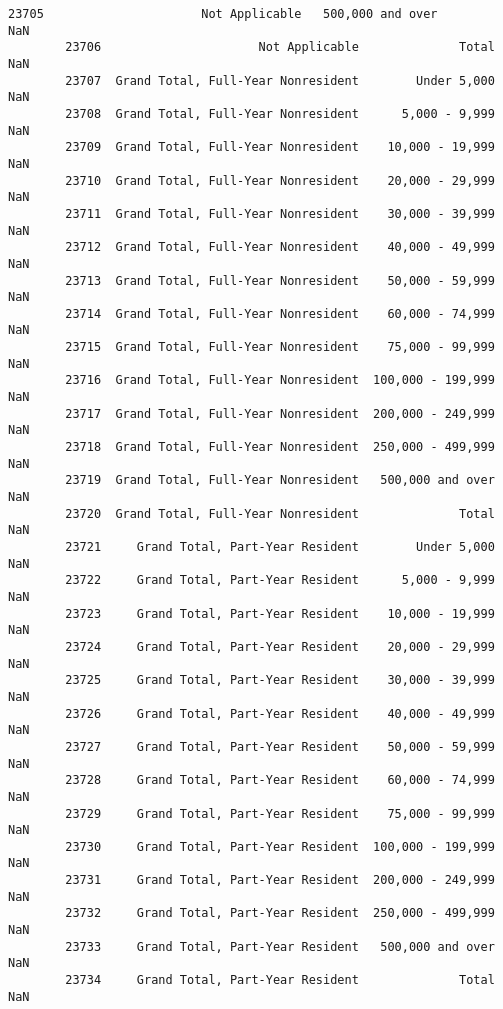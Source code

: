 \documentclass[11pt]{article}
\begin{document}
\begin{Verbatim}[commandchars=\\\{\}]
        23705                      Not Applicable   500,000 and over        NaN   
        23706                      Not Applicable              Total        NaN   
        23707  Grand Total, Full-Year Nonresident        Under 5,000        NaN   
        23708  Grand Total, Full-Year Nonresident      5,000 - 9,999        NaN   
        23709  Grand Total, Full-Year Nonresident    10,000 - 19,999        NaN   
        23710  Grand Total, Full-Year Nonresident    20,000 - 29,999        NaN   
        23711  Grand Total, Full-Year Nonresident    30,000 - 39,999        NaN   
        23712  Grand Total, Full-Year Nonresident    40,000 - 49,999        NaN   
        23713  Grand Total, Full-Year Nonresident    50,000 - 59,999        NaN   
        23714  Grand Total, Full-Year Nonresident    60,000 - 74,999        NaN   
        23715  Grand Total, Full-Year Nonresident    75,000 - 99,999        NaN   
        23716  Grand Total, Full-Year Nonresident  100,000 - 199,999        NaN   
        23717  Grand Total, Full-Year Nonresident  200,000 - 249,999        NaN   
        23718  Grand Total, Full-Year Nonresident  250,000 - 499,999        NaN   
        23719  Grand Total, Full-Year Nonresident   500,000 and over        NaN   
        23720  Grand Total, Full-Year Nonresident              Total        NaN   
        23721     Grand Total, Part-Year Resident        Under 5,000        NaN   
        23722     Grand Total, Part-Year Resident      5,000 - 9,999        NaN   
        23723     Grand Total, Part-Year Resident    10,000 - 19,999        NaN   
        23724     Grand Total, Part-Year Resident    20,000 - 29,999        NaN   
        23725     Grand Total, Part-Year Resident    30,000 - 39,999        NaN   
        23726     Grand Total, Part-Year Resident    40,000 - 49,999        NaN   
        23727     Grand Total, Part-Year Resident    50,000 - 59,999        NaN   
        23728     Grand Total, Part-Year Resident    60,000 - 74,999        NaN   
        23729     Grand Total, Part-Year Resident    75,000 - 99,999        NaN   
        23730     Grand Total, Part-Year Resident  100,000 - 199,999        NaN   
        23731     Grand Total, Part-Year Resident  200,000 - 249,999        NaN   
        23732     Grand Total, Part-Year Resident  250,000 - 499,999        NaN   
        23733     Grand Total, Part-Year Resident   500,000 and over        NaN   
        23734     Grand Total, Part-Year Resident              Total        NaN   
        

\end{Verbatim}
\end{document}
